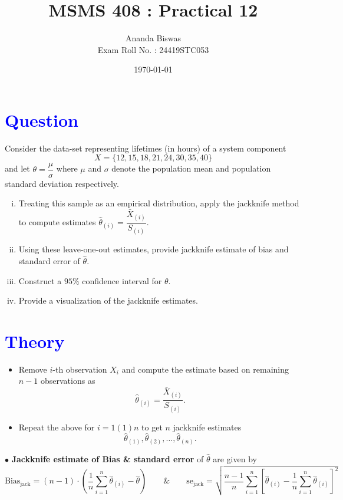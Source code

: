 \documentclass[11pt, a4paper]{article}\usepackage[]{graphicx}\usepackage[]{xcolor}
\title{MSMS 408 : Practical 12}
\author{{\fontsize{22}{20} \benyorithafont Ananda Biswas} \\[1em] Exam Roll No. : 24419STC053}
\date{\today}
\begin{document}
\maketitle


\section*{\faArrowAltCircleRight[regular] \textcolor{blue}{Question}}

\hspace{1cm} Consider the data-set representing lifetimes (in hours) of a system component $$X = \{12, 15, 18, 21, 24, 30, 35, 40\}$$ and let $\theta = \dfrac{\mu}{\sigma}$ where $\mu$ and $\sigma$ denote the population mean and population standard deviation respectively.

\begin{enumerate}[(i)]
\item Treating this sample as an empirical distribution, apply the jackknife method to compute estimates $\widehat{\theta}_{(i)} = \dfrac{\bar{X}_{(i)}}{S_{(i)}}$.

\item Using these leave-one-out estimates, provide jackknife estimate of bias and standard error of $\widehat{\theta}$.

\item Construct a $95\%$ confidence interval for $\theta$.

\item Provide a visualization of the jackknife estimates.
\end{enumerate}

\section*{\faArrowAltCircleRight[regular] \textcolor{blue}{Theory}}

\begin{itemize}
\item Remove $i$-th observation $X_i$ and compute the estimate based on remaining $n-1$ observations as $$\widehat{\theta}_{(i)} = \dfrac{\bar{X}_{(i)}}{S_{(i)}}.$$

\item Repeat the above for $i = 1(1)n$ to get $n$ jackknife estimates $$\widehat{\theta}_{(1)}, \widehat{\theta}_{(2)}, \ldots, \widehat{\theta}_{(n)}.$$
\end{itemize}

$\bullet$ \textbf{Jackknife estimate of Bias \& standard error} of $\hat{\theta}$ are given by $$\text{Bias}_{\text{jack}} = (n - 1) \cdot \left( \dfrac{1}{n} \sum \limits_{i = 1}^{n} \widehat{\theta}_{(i)} - \hat{\theta} \right) \qquad \& \qquad \text{se}_{\text{jack}} = \sqrt{\dfrac{n-1}{n} \sum \limits_{i = 1}^{n} \left[\widehat{\theta}_{(i)} - \dfrac{1}{n} \sum \limits_{i = 1}^{n} \widehat{\theta}_{(i)}\right]^2}$$
\end{document}
